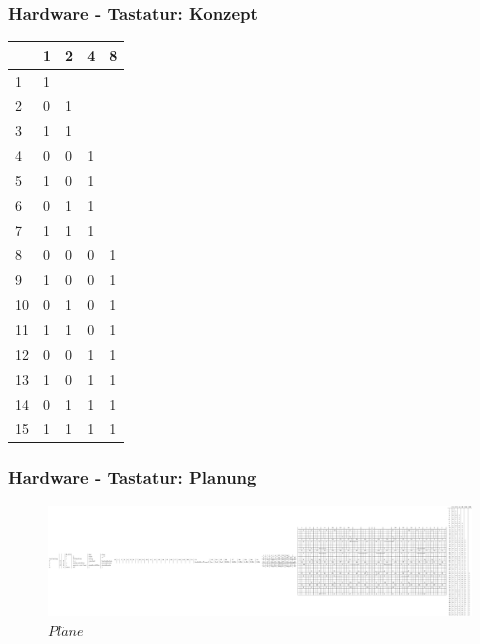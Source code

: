 \documentclass{beamer}
\begin{document}
\begin{frame}
    \frametitle{Hardware - Tastatur: Konzept}
    \begin{tabular}{l|l|l|l|l}
        &\textbf{1}&\textbf{2}&\textbf{4}&\textbf{8}\\
        \hline
        1&1& & &   \\
        2&0&1& &   \\
        3&1&1& &   \\
        4&0&0&1&   \\
        5&1&0&1&   \\
        6&0&1&1&   \\
        7&1&1&1&   \\
        8&0&0&0&1  \\
        9&1&0&0&1  \\
        10&0&1&0&1 \\
        11&1&1&0&1 \\
        12&0&0&1&1 \\
        13&1&0&1&1 \\
        14&0&1&1&1 \\
        15&1&1&1&1 \\
    \end{tabular}
\end{frame}

\begin{frame}
    \frametitle{Hardware - Tastatur: Planung}
    \begin{figure}[h!]
    \includegraphics[width=\linewidth]{plans.pdf}
    \caption{$Pl\ddot{a}ne$}
    \end{figure}
\end{frame}
\end{document}
